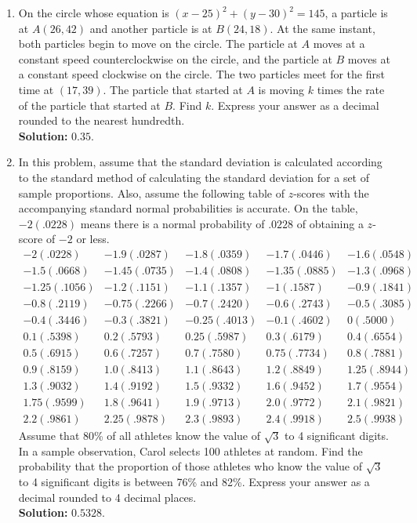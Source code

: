 \documentclass[10pt]{article}
\begin{document}
\begin{enumerate}
\item On the circle whose equation is $(x-25)^2+(y-30)^2=145$, a particle is at $A(26,42)$ and another particle is at $B(24,18)$. At the same instant, both particles begin to move on the circle. The particle at $A$ moves at a constant speed counterclockwise on the circle, and the particle at $B$ moves at a constant speed clockwise on the circle. The two particles meet for the first time at $(17,39)$. The particle that started at $A$ is moving $k$ times the rate of the particle that started at $B$. Find $k$. Express your answer as a decimal rounded to the nearest hundredth.\\
\textbf{Solution:} $0.35$.

\item In this problem, assume that the standard deviation is calculated according to the standard method of calculating the standard deviation for a set of sample proportions. Also, assume the following table of $z$-scores with the accompanying standard normal probabilities is accurate. On the table, $-2(.0228)$ means there is a normal probability of $.0228$ of obtaining a $z$-score of $-2$ or less.
\[
\begin{array}{rrrrr}
-2(.0228)&-1.9(.0287)&-1.8(.0359)&-1.7(.0446)&-1.6(.0548)\\
-1.5(.0668)&-1.45(.0735)&-1.4(.0808)&-1.35(.0885)&-1.3(.0968)\\
-1.25(.1056)&-1.2(.1151)&-1.1(.1357)&-1(.1587)&-0.9(.1841)\\
-0.8(.2119)&-0.75(.2266)&-0.7(.2420)&-0.6(.2743)&-0.5(.3085)\\
-0.4(.3446)&-0.3(.3821)&-0.25(.4013)&-0.1(.4602)&0(.5000)\\
0.1(.5398)&0.2(.5793)&0.25(.5987)&0.3(.6179)&0.4(.6554)\\
0.5(.6915)&0.6(.7257)&0.7(.7580)&0.75(.7734)&0.8(.7881)\\
0.9(.8159)&1.0(.8413)&1.1(.8643)&1.2(.8849)&1.25(.8944)\\
1.3(.9032)&1.4(.9192)&1.5(.9332)&1.6(.9452)&1.7(.9554)\\
1.75(.9599)&1.8(.9641)&1.9(.9713)&2.0(.9772)&2.1(.9821)\\
2.2(.9861)&2.25(.9878)&2.3(.9893)&2.4(.9918)&2.5(.9938)
\end{array}
\]
Assume that 80\% of all athletes know the value of $\sqrt3$ to 4 significant digits. In a sample observation, Carol selects 100 athletes at random. Find the probability that the proportion of those athletes who know the value of $\sqrt3$ to 4 significant digits is between 76\% and 82\%. Express your answer as a decimal rounded to 4 decimal places.\\
\textbf{Solution:} $0.5328$.


\end{enumerate}
\end{document}
